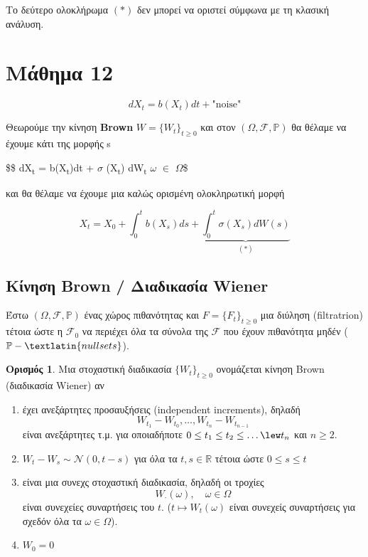 \documentclass[12pt,a4paper]{article}
\theoremstyle{definition}
\numberwithin{equation}{section}
\newtheorem{orismos}{Ορισμός}
\begin{document}
Το δεύτερο ολοκλήρωμα \((*)\)  δεν μπορεί να οριστεί σύμφωνα με τη κλασική ανάλυση.
\pagebreak

\section{Μάθημα 12}
\label{sec:org5290259}


$$dX_t = b(X_t)dt + \text{"noise"}$$

Θεωρούμε την κίνηση \textbf{Brown} \(W = \{W_t\}_{t\geq 0}\) και στον \((\Omega, \mathcal{F},\mathbb{P})\) θα θέλαμε να έχουμε κάτι της μορφής
s




\$\$ dX\textsubscript{t} = b(X\textsubscript{t})dt + \(\sigma\) (X\textsubscript{t}) dW\textsubscript{t}  \qquad \(\omega\) \(\in\) \(\Omega\)\$

και θα θέλαμε να έχουμε μια καλώς ορισμένη ολοκληρωτική μορφή

$$ X_t = X_0 + \int_0^t b(X_s)ds + \underbrace{\int_0^t \sigma(X_s)dW(s)}_{(*)} $$
\subsection{Κίνηση \textlatin{Brown}  / Διαδικασία \textlatin{Wiener}}
\label{sec:org4774d96}

Έστω \((\Omega, \mathcal{F}, \mathbb{P})\) ένας χώρος πιθανότητας και \(F = \{F_t\}_{t\geq 0}\)  μια διύληση (filtratrion) τέτοια ώστε η \(\mathcal{F}_0\) να περιέχει όλα τα σύνολα της \(\mathcal{F}\)
που έχουν πιθανότητα μηδέν (\(\mathbb{P}-\textlatin{null sets}\)).

\begin{orismos}
Μια στοχαστική διαδικασία $\{W_t\}_{t\geq 0}$ ονομάζεται κίνηση \textlatin{Brown} (διαδικασία \textlatin{Wiener}) αν
\begin{enumerate}
    \item έχει ανεξάρτητες προσαυξήσεις (\textlatin{independent increments}), δηλαδή
$$ W_{t_1} - W_{t_0} , \dots , W_{t_n} - W_{t_{n-1}} $$
είναι ανεξάρτητες τ.μ. για οποιαδήποτε $0\leq t_1 \leq t_2 \leq \dots \lew t_n $ και $n\geq 2$.
\item $W_{t} - W_s \sim \mathcal{N}(0, t-s)$ για όλα τα $t,s \in \mathbb{R}$ τέτοια ώστε $0\leq s \leq t$
\item είναι μια συνεχς στοχαστική διαδικασία, δηλαδή οι τροχίες
$$ W_{\cdot}(\omega), \quad \omega \in \Omega$$
είναι συνεχείες συναρτήσεις του $t$. ($t \mapsto W_t(\omega)$ είναι συνεχείς συναρτήσεις για σχεδόν όλα τα $\omega \in \Omega$).
\item $W_0 = 0$
\end{enumerate}
\end{orismos}
\end{document}
